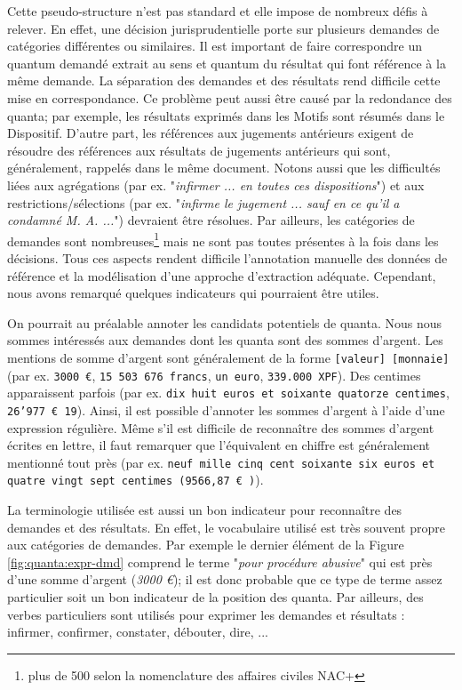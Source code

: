  Cette pseudo-structure n'est pas standard et elle impose de nombreux défis à relever. En effet, une décision jurisprudentielle porte sur plusieurs demandes de catégories différentes ou similaires. Il est important de faire correspondre un quantum demandé extrait au sens et quantum du résultat qui font référence à la même demande. La séparation des demandes et des résultats rend difficile cette mise en correspondance. Ce problème peut aussi être causé par la redondance des quanta; par exemple, les résultats exprimés dans les Motifs sont résumés dans le Dispositif. D'autre part, les références aux jugements antérieurs exigent de résoudre des références aux résultats de jugements antérieurs qui sont, généralement, rappelés dans le même document. Notons aussi que les difficultés liées aux agrégations (par ex. "\textit{infirmer ... en toutes ces dispositions}") et aux restrictions/sélections (par ex. "\textit{infirme le jugement ... sauf en ce qu'il a condamné M. A. ...}") devraient être résolues. Par ailleurs, les catégories de demandes sont nombreuses\footnote{plus de 500 selon la nomenclature des affaires civiles NAC+} mais ne sont pas toutes présentes à la fois dans les décisions. Tous ces aspects rendent difficile l'annotation manuelle des données de référence et la modélisation d'une approche d'extraction adéquate. Cependant, nous avons remarqué quelques indicateurs qui pourraient être utiles.

On pourrait au préalable annoter les candidats potentiels de quanta. Nous nous sommes intéressés aux demandes dont les quanta sont des sommes d'argent. Les mentions de somme d'argent sont généralement de la forme \og \texttt{[valeur] [monnaie]} \fg{} (par ex. \texttt{3000 \euro}, \texttt{15 503 676 francs}, \texttt{un euro}, \texttt{339.000 XPF}). Des centimes apparaissent parfois (par ex. \texttt{dix huit euros et soixante quatorze centimes}, \texttt{26'977 \euro{}  19}).  Ainsi, il est possible d'annoter les sommes d'argent à l'aide d'une expression régulière. Même s'il est difficile de reconnaître des sommes d'argent écrites en lettre, il faut remarquer que l'équivalent en chiffre est généralement mentionné tout près (par ex. \texttt{neuf mille cinq cent soixante six euros et quatre vingt sept centimes (9566,87 \euro{}  )}). 

La terminologie utilisée est aussi un bon indicateur pour reconnaître des demandes et des résultats. En effet, le vocabulaire utilisé est très souvent propre aux catégories de demandes. Par exemple le dernier élément de la Figure \ref{fig:quanta:expr-dmd} comprend le terme "\textit{pour procédure abusive}" qui est près d'une somme d'argent (\textit{3000 \euro{}}); il est donc probable que ce type de terme assez particulier soit un bon indicateur de la position des quanta. Par ailleurs, des verbes particuliers sont utilisés pour exprimer les demandes et résultats : infirmer, confirmer, constater, débouter, dire, ... %




